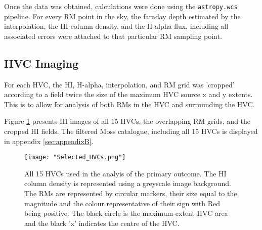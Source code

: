 Once the data was obtained, calculations were done using the \verb|astropy.wcs| pipeline. For every RM point in the sky, the faraday depth estimated by the interpolation, the HI column density, and the H-alpha flux, including all associated errors were attached to that particular RM sampling point.

\subsection{HVC Imaging}
\label{ssec:hvc_snapshot}

For each HVC, the HI, H-alpha, interpolation, and RM grid was 'cropped' according to a field twice the size of the maximum HVC source x and y extents. This is to allow for analysis of both RMs in the HVC and surrounding the HVC.


Figure \ref{fig:all_hvcs} presents HI images of all 15 HVCs, the overlapping RM grids, and the cropped HI fields. The filtered Moss catalogue, including all 15 HVCs is displayed in appendix \ref{sec:appendixB}.

\begin{figure}
    \texttt{[image: "Selected\_HVCs.png"]}
    \centering
    \caption{All 15 HVCs used in the analyis of the primary outcome. The HI column density is represented using a greyscale image background. The RMs are represented by circular markers, their size equal to the magnitude and the colour representative of their sign with Red being positive. The black circle is the maximum-extent HVC area and the black 'x' indicates the centre of the HVC.}
    \label{fig:all_hvcs}
\end{figure}

